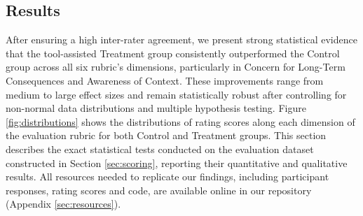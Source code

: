 
\subsection{Results}

After ensuring a high inter-rater agreement, we present strong statistical evidence that
the tool-assisted Treatment group consistently outperformed the Control group across all six rubric's dimensions, particularly in Concern for Long-Term Consequences and Awareness of Context. These improvements range from medium to large effect sizes and remain statistically robust after controlling for non-normal data distributions and multiple hypothesis testing. Figure \ref{fig:distributions} shows the distributions of rating scores along each dimension of the evaluation rubric for both Control and Treatment groups. This section describes the exact statistical tests conducted on the evaluation dataset constructed in Section \ref{sec:scoring}, reporting their quantitative and qualitative results.
All resources needed to replicate our findings, including participant responses, rating scores and code, are available online in our repository (Appendix \ref{sec:resources}).

